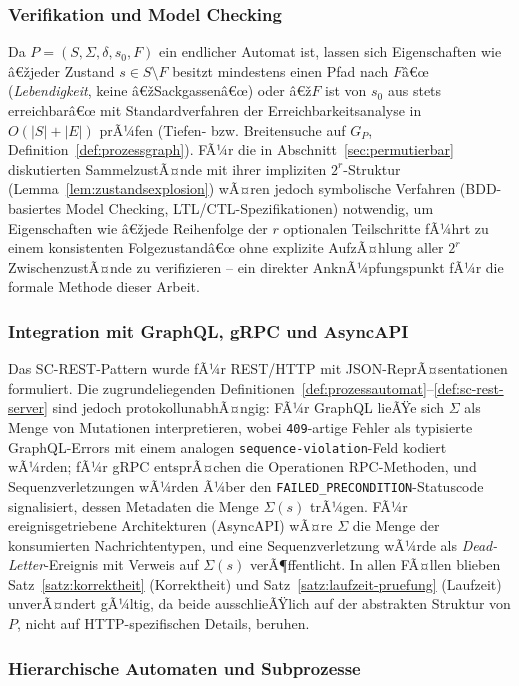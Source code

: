 ﻿\documentclass[a4paper,12pt]{article}
\theoremstyle{definition}
\begin{document}
\subsubsection{Verifikation und Model Checking}

Da $P=(S,\Sigma,\delta,s_0,F)$ ein endlicher Automat ist, lassen sich Eigenschaften wie
â€žjeder Zustand $s\in S\setminus F$ besitzt mindestens einen Pfad nach $F$â€œ
(\emph{Lebendigkeit}, keine â€žSackgassenâ€œ) oder â€ž$F$ ist von $s_0$ aus stets erreichbarâ€œ
mit Standardverfahren der Erreichbarkeitsanalyse in $O(|S|+|E|)$ prÃ¼fen (Tiefen- bzw.
Breitensuche auf $G_P$, Definition~\ref{def:prozessgraph}). FÃ¼r die in
Abschnitt~\ref{sec:permutierbar} diskutierten SammelzustÃ¤nde mit ihrer impliziten
$2^r$-Struktur (Lemma~\ref{lem:zustandsexplosion}) wÃ¤ren jedoch symbolische Verfahren
(BDD-basiertes Model Checking, LTL/CTL-Spezifikationen) notwendig, um Eigenschaften wie
â€žjede Reihenfolge der $r$ optionalen Teilschritte fÃ¼hrt zu einem konsistenten
Folgezustandâ€œ ohne explizite AufzÃ¤hlung aller $2^r$ ZwischenzustÃ¤nde zu verifizieren --
ein direkter AnknÃ¼pfungspunkt fÃ¼r die formale Methode dieser Arbeit.

\subsubsection{Integration mit GraphQL, gRPC und AsyncAPI}

Das SC-REST-Pattern wurde fÃ¼r REST/HTTP mit JSON-ReprÃ¤sentationen formuliert. Die
zugrundeliegenden Definitionen~\ref{def:prozessautomat}--\ref{def:sc-rest-server} sind
jedoch protokollunabhÃ¤ngig: FÃ¼r GraphQL lieÃŸe sich $\Sigma$ als Menge von Mutationen
interpretieren, wobei \texttt{409}-artige Fehler als typisierte GraphQL-Errors mit einem
analogen \texttt{sequence-violation}-Feld kodiert wÃ¼rden; fÃ¼r gRPC entsprÃ¤chen die
Operationen RPC-Methoden, und Sequenzverletzungen wÃ¼rden Ã¼ber den
\texttt{FAILED\_PRECONDITION}-Statuscode signalisiert, dessen Metadaten die Menge
$\Sigma(s)$ trÃ¼gen. FÃ¼r ereignisgetriebene Architekturen (AsyncAPI) wÃ¤re $\Sigma$ die
Menge der konsumierten Nachrichtentypen, und eine Sequenzverletzung wÃ¼rde als
\emph{Dead-Letter}-Ereignis mit Verweis auf $\Sigma(s)$ verÃ¶ffentlicht. In allen FÃ¤llen
blieben Satz~\ref{satz:korrektheit} (Korrektheit) und Satz~\ref{satz:laufzeit-pruefung}
(Laufzeit) unverÃ¤ndert gÃ¼ltig, da beide ausschlieÃŸlich auf der abstrakten Struktur von
$P$, nicht auf HTTP-spezifischen Details, beruhen.

\subsubsection{Hierarchische Automaten und Subprozesse}
\end{document}
